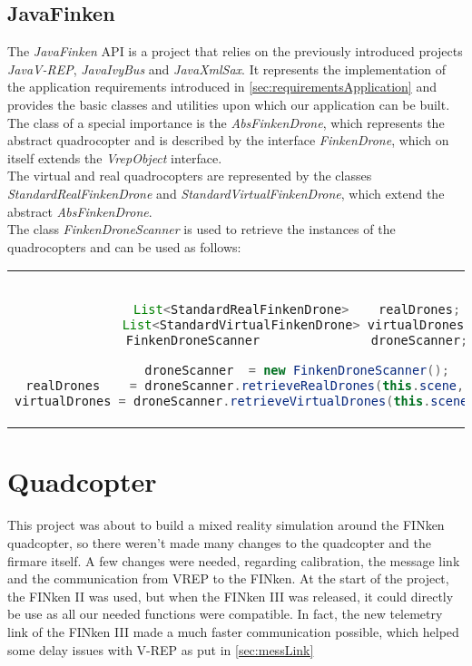 \subsection{JavaFinken}
\label{sec:javaFinkenImplementation}

The \textit{JavaFinken} API is a project that relies on the previously introduced projects \textit{JavaV-REP}, \textit{JavaIvyBus} and \textit{JavaXmlSax}. It represents the implementation of the application requirements introduced in \ref{sec:requirementsApplication} and provides the basic classes and utilities upon which our application can be built.\\

The class of a special importance is the \textit{AbsFinkenDrone}, which represents the abstract quadrocopter and is described by the interface \textit{FinkenDrone}, which on itself extends the \textit{VrepObject} interface.\\
The virtual and real quadrocopters are represented by the classes \textit{StandardRealFinkenDrone} and \textit{StandardVirtualFinkenDrone}, which extend the abstract \textit{AbsFinkenDrone}.\\
The class \textit{FinkenDroneScanner} is used to retrieve the instances of the quadrocopters and can be used as follows:

\begin{center}
\begin{tabular}{c}
\begin{lstlisting}[basicstyle=\small, language=Java]

List<StandardRealFinkenDrone>    realDrones;
List<StandardVirtualFinkenDrone> virtualDrones;
FinkenDroneScanner               droneScanner;

droneScanner  = new FinkenDroneScanner();
realDrones    = droneScanner.retrieveRealDrones(this.scene, this.client);
virtualDrones = droneScanner.retrieveVirtualDrones(this.scene, this.client);

\end{lstlisting}
\end{tabular}
\end{center}

\section{Quadcopter}

This project was about to build a mixed reality simulation around the FINken quadcopter, so there weren't made many changes to the quadcopter and the firmare itself. A few changes were needed, regarding calibration, the message link and the communication from VREP to the FINken. At the start of the project, the FINken II was used, but when the FINken III was released, it could directly be use as all our needed functions were compatible. In fact, the new telemetry link of the FINken III made a much faster communication possible, which helped some delay issues with V-REP as put in \ref{sec:messLink}
